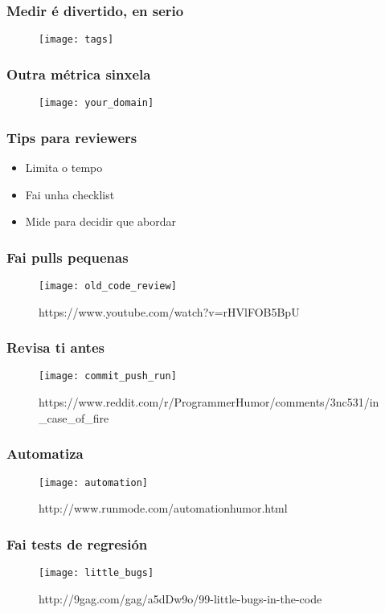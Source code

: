\begin{frame}
  \frametitle{Medir é divertido, en serio}
  \begin{figure}[ht]
    \texttt{[image: tags]}
  \end{figure}
\end{frame}

\begin{frame}
  \frametitle{Outra métrica sinxela}
  \begin{figure}[ht]
    \texttt{[image: your\_domain]}
  \end{figure}
\end{frame}

\begin{frame}
  \frametitle{Tips para reviewers}
  \begin{itemize}
    \item Limita o tempo
    \item Fai unha checklist
    \item Mide para decidir que abordar
  \end{itemize}
\end{frame}

\begin{frame}
  \frametitle{Fai pulls pequenas}
  \begin{figure}[ht]
    \texttt{[image: old\_code\_review]}
    \caption{https://www.youtube.com/watch?v=rHVlFOB5BpU}
  \end{figure}
\end{frame}

\begin{frame}
  \frametitle{Revisa ti antes}
  \begin{figure}[ht]
    \texttt{[image: commit\_push\_run]}
    \caption{https://www.reddit.com/r/ProgrammerHumor/comments/3nc531/in\_case\_of\_fire}
  \end{figure}
\end{frame}

\begin{frame}
  \frametitle{Automatiza}
  \begin{figure}[ht]
    \texttt{[image: automation]}
    \caption{http://www.runmode.com/automationhumor.html}
  \end{figure}
\end{frame}

\begin{frame}
  \frametitle{Fai tests de regresión}
  \begin{figure}[ht]
    \texttt{[image: little\_bugs]}
    \caption{http://9gag.com/gag/a5dDw9o/99-little-bugs-in-the-code}
  \end{figure}
\end{frame}

